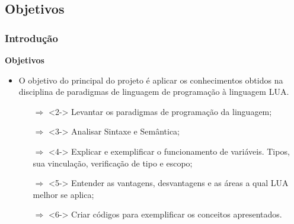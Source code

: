 \documentclass{beamer}
\begin{document}
\subsection{Objetivos}
\begin{frame}[fragile]
	\frametitle{Introdução}
	{\bf Objetivos}\vspace{0.4cm}
	\begin{itemize}
		\item<1-> O objetivo do principal do projeto é aplicar os conhecimentos obtidos na disciplina de paradigmas de linguagem de programação à linguagem LUA.
		\begin{itemize}
			\item[$\Rightarrow$]<2-> Levantar os paradigmas de programação da linguagem;
			\item[$\Rightarrow$]<3-> Analisar Sintaxe e Semântica;
			\item[$\Rightarrow$]<4-> Explicar e exemplificar o funcionamento de variáveis. Tipos, sua vinculação, verificação de tipo e escopo;
			\item[$\Rightarrow$]<5-> Entender as vantagens, desvantagens e as áreas a qual LUA melhor se aplica;
			\item[$\Rightarrow$]<6-> Criar códigos para exemplificar os conceitos apresentados. 
		\end{itemize}
	\end{itemize}
\end{frame}
\end{document}
